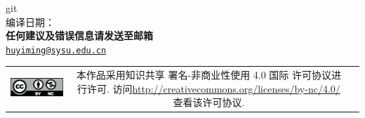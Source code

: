 \documentclass{qbook}
\begin{document}
\pagestyle{empty}

\begin{center}
        git \commitID\\
        编译日期：\commitDATE\\
	\Large{\sffamily\bfseries\heiti 任何建议及错误信息请发送至邮箱} \\
        \texttt{\href{mailto:huyiming@sysu.edu.cn}{huyiming@sysu.edu.cn}}
\end{center} 
\vfill
\vspace{30em}
\begin{tabular*}{\textwidth}{ccc}
	\includegraphics{figure/by-nc.eps}
	& \begin{minipage}[b]{0.7\textwidth}
		\small\sffamily
		本作品采用知识共享 署名-非商业性使用 4.0 国际 许可协议进行许可. 访问\url{http://creativecommons.org/licenses/by-nc/4.0/  }查看该许可协议.
	\end{minipage}
\end{tabular*}  
\thispagestyle{empty}
\frontmatter  %
\pagestyle{empty}

\pagestyle{empty}
\tableofcontents
\cleardoublepage
 
\mainmatter	  %
\pagestyle{fancy}
\setcounter{page}{0}










\backmatter	
\printbibliography[heading=bibintoc]
\makeatletter
\makeatother
\end{document}
